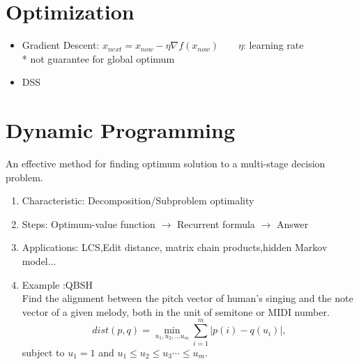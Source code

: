 \documentclass[12pt,a4paper,draft]{article}
\begin{document}
\section{Optimization}\label{sec:GD} %
\begin{itemize}
\item Gradient Descent: $x_{next} = x_{now} -\eta\nabla f(x_{now}) \qquad \eta$: learning rate\\
* not guarantee for global optimum
\item DSS
\end{itemize}
\section{Dynamic Programming} %
An effective method for finding optimum solution to a multi-stage decision problem.
\begin{enumerate}
\item Characteristic: Decomposition/Subproblem optimality
\item Steps: Optimum-value function $\rightarrow$ Recurrent formula $\rightarrow$ Answer
\item Applications: LCS,Edit distance, matrix chain products,hidden Markov model...
\item Example :QBSH\\
Find the alignment between the pitch vector of human's singing and the note vector of a given melody, both in the unit of semitone or MIDI number. \\
$$ dist(p, q)=\min_{u_1, u_2, ... u_{m}}\sum_{i=1}^{m} |p(i)-q(u_i)|, $$ subject to $u_1=1$ and $u_1 \leq u_2 \leq u_3 \cdots \leq u_{m}$.
\end{enumerate}
\end{document}
